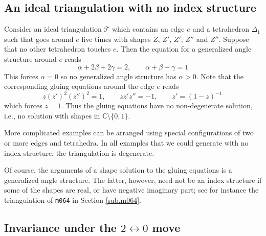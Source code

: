 \documentclass[12pt]{amsart}
\theoremstyle{definition}
\def\BC{\mathbb C}
\def\calT{\mathcal T}
\def\a{\alpha}
\def\ga{\gamma}
\def\b{\beta}
\numberwithin{equation}{section}
\begin{document}


\subsection{An ideal triangulation with no index structure}
\label{sub.noindex}

Consider an ideal triangulation $\calT$ which contains an edge $e$
and a tetrahedron $\Delta_1$ such that goes around $e$ five times with shapes
$Z$, $Z'$, $Z'$, $Z''$ and $Z''$. Suppose that no other tetrahedron 
touches $e$. Then the equation for a generalized angle structure around $e$ 
reads
$$
\a + 2 \b + 2 \ga =2, \qquad \a + \b + \ga =1
$$
This forces $\a=0$ so no generalized angle structure has $\a >0$. 
Note that the corresponding gluing equations around the edge $e$ reads
$$
z (z')^2 (z'')^2 = 1, \qquad z z' z'' =-1, \qquad z'=(1-z)^{-1} \,
$$
which forces $z=1$. Thus the gluing equations have no non-degenerate
solution, i.e., no solution with shapes in $\BC\setminus\{0,1\}$.

More complicated examples can be arranged using special configurations of
two or more edges and tetrahedra. In all examples that we could generate
with no index structure, the triangulation is degenerate. 

Of course, the arguments of a shape solution to the gluing equations 
is a generalized angle structure. The latter, however, need not be an
index structure if some of the shapes are real, or have negative
imaginary part; see for instance the triangulation of {\tt m064} 
in Section \ref{sub.m064}.

\subsection{Invariance under the $2 \leftrightarrow 0$ move}
\label{sub.20move}
\end{document}
